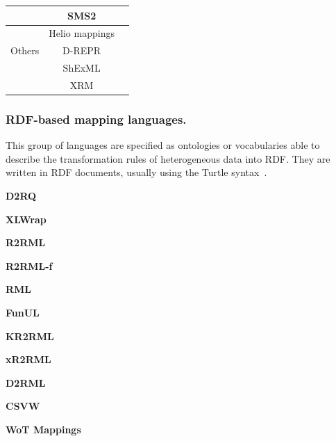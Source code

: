 \begin{table}[t]
\begin{tabular}{c|c|c}
                              & SMS2            & \cite{sms2}\\ \hline
\multirow{3}{*}{Others}       & Helio mappings  & \cite{cimmino2022helio}\\ \cline{2-3} 
                              & D-REPR          & \cite{Vu2019d-repr}\\ \cline{2-3} 
                              & ShExML          & \cite{Garcia-Gonzalez2020shexml,shexml}\\ \cline{2-3}
                              & XRM             & \cite{xrm}\\ \hline
\end{tabular}
\end{table}

\subsubsection{RDF-based mapping languages.} 

This group of languages are specified as ontologies or vocabularies able to describe the transformation rules of heterogeneous data into RDF. They are written in RDF documents, usually using the Turtle syntax~\cite{turtle}. 



\noindent\textbf{D2RQ}~\cite{bizer2004d2rq}

\noindent\textbf{XLWrap}~\cite{langegger2009xlwrap}

\noindent\textbf{R2RML}~\cite{das2012r2rml}

\noindent\textbf{R2RML-f}~\cite{debruyne2016r2rmlf}

\noindent\textbf{RML}~\cite{Dimou2014rml}

\noindent\textbf{FunUL}~\cite{junior2016funul}

\noindent\textbf{KR2RML}~\cite{slepicka2015kr2rml}

\noindent\textbf{xR2RML}~\cite{michel2015xr2rml}

\noindent\textbf{D2RML}~\cite{chortaras2018d2rml}

\noindent\textbf{CSVW}~\cite{Tennison2015csvw}

\noindent\textbf{WoT Mappings}~\cite{cimmino2020ewot}

